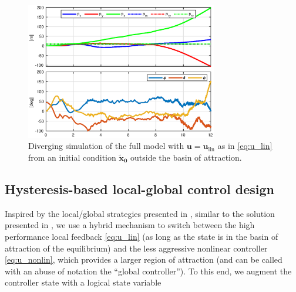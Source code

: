 \begin{figure}[ht!]
    \centering
    \includegraphics[trim=0cm 0cm 0cm 0cm,clip,width=\columnwidth, height=6cm]{figures/diverge2.eps}
    \vspace*{-7mm}
    \caption{Diverging simulation of the full model with $\boldsymbol{u} = \boldsymbol{u}_{\text{lin}}$ as in 
    \eqref{eq:u_lin} from an initial condition $\boldsymbol{\tilde x_0}$ outside the basin of attraction.}
    \label{fig_linearize_div}
\end{figure}



\subsection{Hysteresis-based local-global control design}
 
Inspired by the local/global strategies presented in \cite[Ex. 1.7]{65}, similar to the solution presented in \cite{DBLP:conf/IEEEcca/AndreettoFZ16}, we use a hybrid mechanism to switch between the high performance local feedback \eqref{eq:u_lin} (as long as the state is in the basin of attraction of the equilibrium) and the less aggressive nonlinear controller \eqref{eq:u_nonlin}, which provides a larger region of attraction (and can be called with an abuse of notation the ``global controller''). To this end, we augment the controller state with a logical state variable

